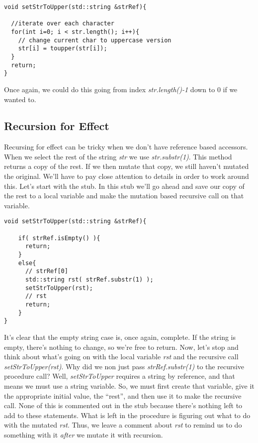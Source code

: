 \documentclass[]{tufte-handout}
\begin{document}
\begin{verbatim}
void setStrToUpper(std::string &strRef){
 
  //iterate over each character
  for(int i=0; i < str.length(); i++){
	// change current char to uppercase version
	str[i] = toupper(str[i]);
  }
  return;
}
\end{verbatim}

Once again, we could do this going from index \textit{str.length()-1} down to $0$ if we wanted to. 

\subsection{Recursion for Effect}

Recursing for effect can be tricky when we don't have reference based accessors. When we select the rest of the string \textit{str} we use \textit{str.substr(1)}.  This method returns a copy of the rest.  If we then mutate that copy, we still haven't mutated the original.  We'll have to pay close attention to details in order to work around this. Let's start with the stub. In this stub we'll go ahead and save our copy of the rest to a local variable and make the mutation based recursive call on that variable.

\begin{verbatim}
void setStrToUpper(std::string &strRef){
 	
 	if( strRef.isEmpty() ){
 	  return;
 	}
 	else{
 	  // strRef[0]
	  std::string rst( strRef.substr(1) );  	  
 	  setStrToUpper(rst);
 	  // rst
 	  return;
 	}
}
\end{verbatim} 

It's clear that the empty string case is, once again, complete. If the string is empty, there's nothing to change, so we're free to return. Now, let's stop and think about what's going on with the local variable \textit{rst} and the recursive call \textit{setStrToUpper(rst)}. Why did we non just pass \textit{strRef.substr(1)} to the recursive procedure call?  Well, \textit{setStrToUpper} requires a string by reference, and that means we must use a string variable. So, we must first create that variable, give it the appropriate initial value, the ``rest'', and then use it to make the recursive call. None of this is commented out in the stub because there's nothing left to add to these statements. What is left in the procedure is figuring out what to do with the mutated \textit{rst}. Thus, we leave a comment about \textit{rst} to remind us to do something with it \textit{after} we mutate it with recursion. 
\end{document}
